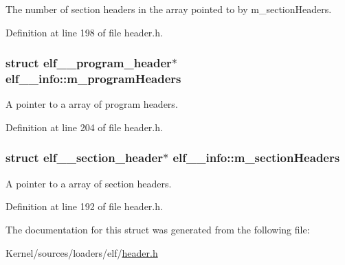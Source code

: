 The number of section headers in the array pointed to by m\_\-sectionHeaders. 



Definition at line 198 of file header.h.

\hypertarget{structelf__32__info_a26df4e771f5978aa40f2ddef21370e4b}{
\subsubsection[{m\_\-programHeaders}]{\setlength{\rightskip}{0pt plus 5cm}struct {\bf elf\_\_\-program\_\-header}$\ast$ {\bf elf\_\_\-info::m\_\-programHeaders}}}
\label{structelf__32__info_a26df4e771f5978aa40f2ddef21370e4b}


A pointer to a array of program headers. 



Definition at line 204 of file header.h.

\hypertarget{structelf__32__info_ab8d46ddc9a0d9ba619b7ab8d296e8b52}{
\subsubsection[{m\_\-sectionHeaders}]{\setlength{\rightskip}{0pt plus 5cm}struct {\bf elf\_\_\-section\_\-header}$\ast$ {\bf elf\_\_\-info::m\_\-sectionHeaders}}}
\label{structelf__32__info_ab8d46ddc9a0d9ba619b7ab8d296e8b52}


A pointer to a array of section headers. 



Definition at line 192 of file header.h.



The documentation for this struct was generated from the following file:\begin{DoxyCompactItemize}
\item 
Kernel/sources/loaders/elf/\hyperlink{header_8h}{header.h}\end{DoxyCompactItemize}
